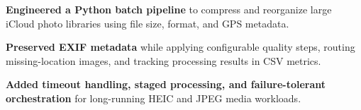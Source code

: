 \begin{bullets}
    \item \textbf{Engineered a Python batch pipeline} to compress and reorganize large iCloud photo libraries using file size, format, and GPS metadata.
    \item \textbf{Preserved EXIF metadata} while applying configurable quality steps, routing missing-location images, and tracking processing results in CSV metrics.
    \item \textbf{Added timeout handling, staged processing, and failure-tolerant orchestration} for long-running HEIC and JPEG media workloads.
\end{bullets}